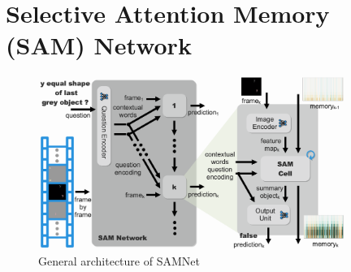 \section{Selective Attention Memory (SAM) Network}



\begin{figure}[!t]
	\centering
	\includegraphics[width=0.9\textwidth]{../img/architecture/samnet_architecture4}
	\caption{General architecture of SAMNet}
	\label{fig:samnet}
\end{figure}

